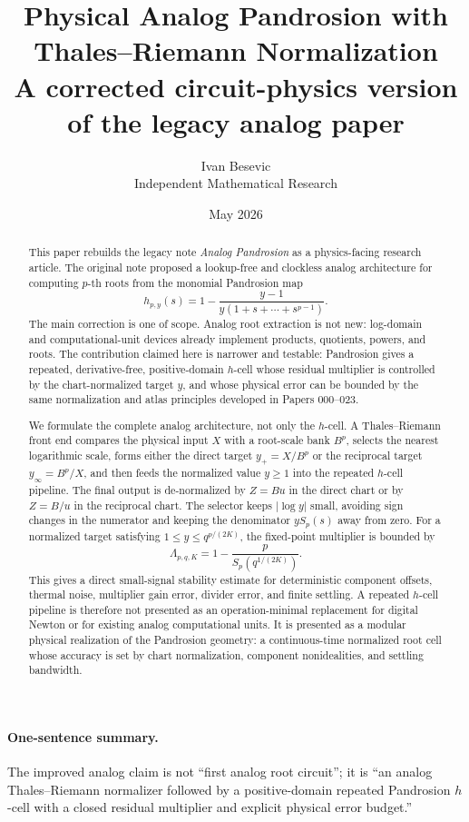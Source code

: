 \documentclass[11pt]{article}
\title{Physical Analog Pandrosion with Thales--Riemann Normalization\\[3pt]
\large A corrected circuit-physics version of the legacy analog paper}
\author{Ivan Besevic\\Independent Mathematical Research}
\date{May 2026}
\begin{document}
\maketitle

\begin{abstract}
This paper rebuilds the legacy note \emph{Analog Pandrosion} as a physics-facing
research article.  The original note proposed a lookup-free and clockless
analog architecture for computing \(p\)-th roots from the monomial Pandrosion
map
\[
        h_{p,y}(s)=1-\frac{y-1}{y(1+s+\cdots+s^{p-1})}.
\]
The main correction is one of scope.  Analog root extraction is not new:
log-domain and computational-unit devices already implement products,
quotients, powers, and roots.  The contribution claimed here is narrower and
testable: Pandrosion gives a repeated, derivative-free, positive-domain
\(h\)-cell whose residual multiplier is controlled by the chart-normalized
target \(y\), and whose physical error can be bounded by the same
normalization and atlas principles developed in Papers 000--023.

We formulate the complete analog architecture, not only the \(h\)-cell.  A
Thales--Riemann front end compares the physical input \(X\) with a root-scale
bank \(B^p\), selects the nearest logarithmic scale, forms either the direct
target \(y_+=X/B^p\) or the reciprocal target \(y_\infty=B^p/X\), and then
feeds the normalized value \(y\ge1\) into the repeated \(h\)-cell pipeline.
The final output is de-normalized by \(Z=Bu\) in the direct chart or by
\(Z=B/u\) in the reciprocal chart.  The selector keeps \(|\log y|\) small,
avoiding sign changes in the numerator and keeping the denominator \(yS_p(s)\)
away from zero.  For a normalized target satisfying
\(1\le y\le q^{p/(2K)}\), the fixed-point multiplier is bounded by
\[
        \Lambda_{p,q,K}=1-\frac{p}{S_p(q^{1/(2K)})}.
\]
This gives a direct small-signal stability estimate for deterministic
component offsets, thermal noise, multiplier gain error, divider error, and
finite settling.  A repeated \(h\)-cell pipeline is therefore not presented as
an operation-minimal replacement for digital Newton or for existing analog
computational units.  It is presented as a modular physical realization of the
Pandrosion geometry: a continuous-time normalized root cell whose accuracy is
set by chart normalization, component nonidealities, and settling bandwidth.
\end{abstract}

\paragraph{One-sentence summary.}
The improved analog claim is not ``first analog root circuit''; it is
``an analog Thales--Riemann normalizer followed by a positive-domain repeated
Pandrosion \(h\)-cell with a closed residual multiplier and explicit physical
error budget.''
\end{document}
